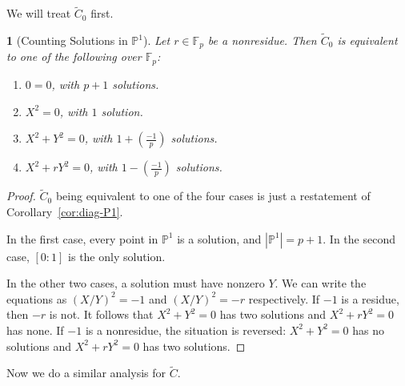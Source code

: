 \documentclass[10pt,a4paper]{amsart}
\numberwithin{equation}{section}
\numberwithin{figure}{section}
\numberwithin{table}{section}
\theoremstyle{definition}
\theoremstyle{plain}
\theoremstyle{remark}
\theoremstyle{plain}
\theoremstyle{definition}
\theoremstyle{plain}
\newtheorem{prop}[thm]{\protect\propositionname}
\theoremstyle{plain}
\providecommand{\propositionname}{Proposition}
\newcommand{\legendre}[2]{\genfrac{(}{)}{}{}{#1}{#2}}
\renewcommand{\P}{\mathbb{P}}
\newcommand{\F}{\mathbb{F}}
\begin{document}
	We will treat $\widetilde{C}_0$ first.
	\begin{prop}[Counting Solutions in $\P^1$]
		\label{prop:counting-P1-solutions}
		Let $r\in \F_p$ be a nonresidue. Then $\widetilde{C}_0$ is equivalent to one of the following over $\F_p$:
		\begin{enumerate}
			\item \label{case:0} $0 = 0$, with $p+1$ solutions.
			\item $X^2 = 0$, with $1$ solution.
			\item \label{case:x^2+y^2=0} $X^2 + Y^2 = 0$, with 
			$1 + \legendre{-1}{p}$ solutions.
			\item $X^2 + rY^2 = 0$, with 
			$1 - \legendre{-1}{p}$ solutions.
		\end{enumerate}
	\end{prop}
	\begin{proof}
		$\widetilde{C}_0$ being equivalent to one of the four cases is just a restatement of Corollary~\ref{cor:diag-P1}.
		
		In the first case, every point in $\P^1$ is a solution, and $|\P^1| = p+1$. In the second case, $[0:1]$ is the only solution.
		
		In the other two cases, a solution must have nonzero $Y$. We can write the equations as
		$(X/Y)^2 = -1$ and $(X/Y)^2 = -r$ respectively. If $-1$ is a residue,
		then $-r$ is not. It follows that $X^2 + Y^2 = 0$ has two solutions and $X^2 +
		rY^2 = 0$ has none. If $-1$ is a nonresidue, the situation is reversed: $X^2 +
		Y^2 = 0$ has no solutions and $X^2 + rY^2 = 0$ has two solutions.
	\end{proof}
	
	Now we do a similar analysis for $\widetilde{C}$.
	
\end{document}
